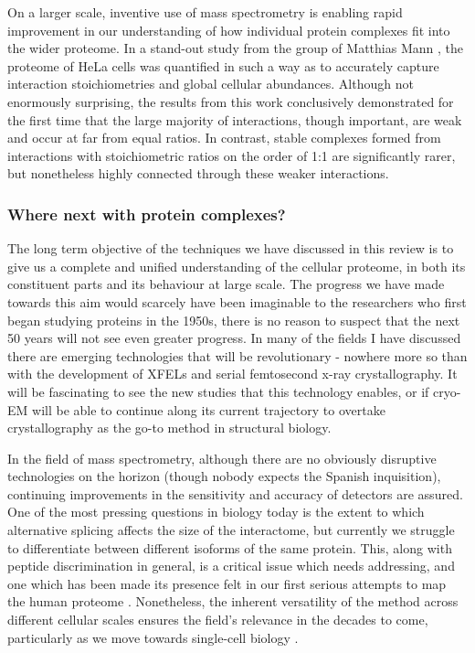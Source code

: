 \documentclass[a4paper,11pt,twoside,openright]{scrbook}
\begin{document}
On a larger scale, inventive use of mass spectrometry is enabling rapid improvement in our understanding of how individual protein complexes fit into the wider proteome. In a stand-out study from the group of Matthias Mann \cite{Hein2015}, the proteome of HeLa cells was quantified in such a way as to accurately capture interaction stoichiometries and global cellular abundances. Although not enormously surprising, the results from this work conclusively demonstrated for the first time that the large majority of interactions, though important, are weak and occur at far from equal ratios. In contrast, stable complexes formed from interactions with stoichiometric ratios on the order of 1:1 are significantly rarer, but nonetheless highly connected through these weaker interactions.

\subsubsection{Where next with protein complexes?}
The long term objective of the techniques we have discussed in this review is to give us a complete and unified understanding of the cellular proteome, in both its constituent parts and its behaviour at large scale. The progress we have made towards this aim would scarcely have been imaginable to the researchers who first began studying proteins in the 1950s, there is no reason to suspect that the next 50 years will not see even greater progress. In many of the fields I have discussed there are emerging technologies that will be revolutionary - nowhere more so than with the development of XFELs and serial femtosecond x-ray crystallography. It will be fascinating to see the new studies that this technology enables, or if cryo-EM will be able to continue along its current trajectory to overtake crystallography as the go-to method in structural biology.

In the field of mass spectrometry, although there are no obviously disruptive technologies on the horizon (though nobody expects the Spanish inquisition), continuing improvements in the sensitivity and accuracy of detectors are assured. One of the most pressing questions in biology today is the extent to which alternative splicing affects the size of the interactome, but currently we struggle to differentiate between different isoforms of the same protein. This, along with peptide discrimination in general, is a critical issue which needs addressing, and one which has been made its presence felt in our first serious attempts to map the human proteome \cite{Kim2014,Wilhelm2014,Ezkurdia2014}. Nonetheless, the inherent versatility of the method across different cellular scales ensures the field's relevance in the decades to come, particularly as we move towards single-cell biology \cite{Macaulay2017}.
\end{document}
